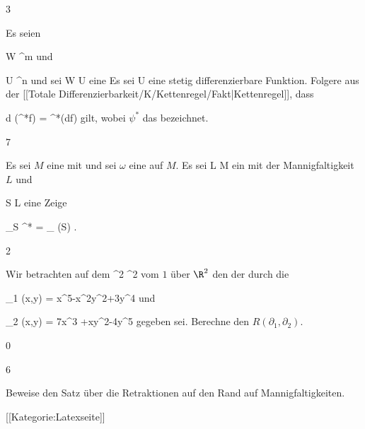 {3}
{

Es seien

\mavergleichskette
{\vergleichskette
{ W
}
{ \subseteq }{ \R^m
}
{  }{
}
{    }{
}
{   }{
}
}
{}{}{}
und

\mavergleichskette
{\vergleichskette
{ U
}
{ \subseteq }{ \R^n
}
{  }{
}
{    }{
}
{   }{
}
}
{}{}{}
und sei
\maabbdisp {\psi} { W } { U
} {}
eine
Es sei
 { U } {\R
} {}
eine stetig differenzierbare Funktion. Folgere aus der
[[Totale Differenzierbarkeit/K/Kettenregel/Fakt|Kettenregel]],
dass

\mavergleichskettedisp
{\vergleichskette
{ d (\psi^*f)
}
{ =} { \psi^*(df)
}
{ } {
}
{ } {
}
{ } {
}
}
{}{}{}
gilt, wobei $\psi^*$ das
bezeichnet.

}
{} {}

{7}
{

Es sei $M$ eine
mit
und sei $\omega$ eine
auf $M$. Es sei
\maabbdisp {\varphi} { L } { M
} {}
ein
mit der Mannigfaltigkeit $L$ und

\mavergleichskette
{\vergleichskette
{ S
}
{ \subseteq }{ L
}
{  }{
}
{    }{
}
{   }{
}
}
{}{}{}
eine
Zeige

\mavergleichskettedisp
{\vergleichskette
{ \int_S \varphi^* \omega
}
{ =} { \int_{ \varphi(S)} \omega
}
{ } {
}
{ } {
}
{ } {
}
}
{}{}{.}

}
{} {}

{2}
{

Wir betrachten auf dem
 {\R^2 \times \R} { \R^2
} {}
vom
$1$ über $\R^2$ den
der durch die

\mavergleichskette
{\vergleichskette
{ \Gamma_1 (x,y)
}
{ = }{ x^5-x^2y^2+3y^4
}
{  }{
}
{    }{
}
{   }{
}
}
{}{}{}
und

\mavergleichskette
{\vergleichskette
{ \Gamma_2 (x,y)
}
{ = }{ 7x^3 +xy^2-4y^5
}
{  }{
}
{    }{
}
{   }{
}
}
{}{}{}
gegeben sei. Berechne den
$R \left(  \partial_1, \partial_2  \right)$.

}
{} {}

{0}
{

}
{} {}

{6}
{

Beweise den Satz über die Retraktionen auf den Rand auf Mannigfaltigkeiten.

}
{} {}

 [[Kategorie:Latexseite]]
